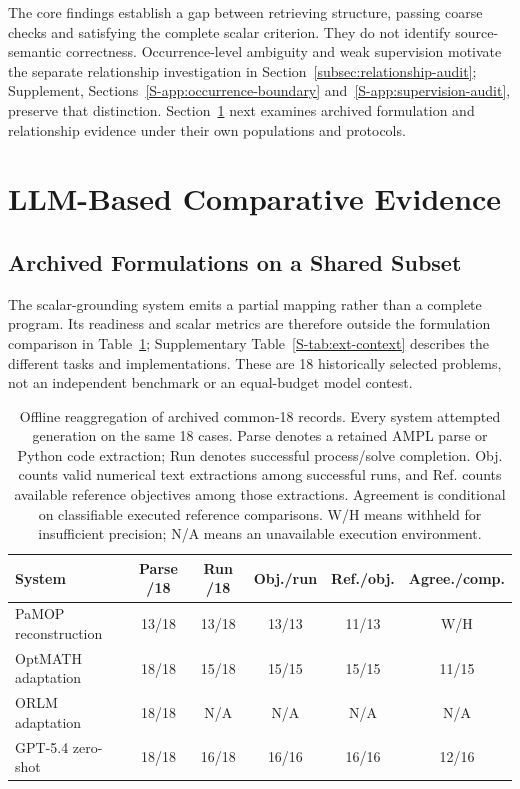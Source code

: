 \documentclass[pdflatex,sn-basic,Numbered]{sn-jnl}
\begin{document}
\label{subsec:numerical-grounding-challenges}
The core findings establish a gap between retrieving structure, passing coarse checks and satisfying the complete scalar criterion. They do not identify source-semantic correctness. Occurrence-level ambiguity and weak supervision motivate the separate relationship investigation in Section~\ref{subsec:relationship-audit}; Supplement, Sections~\ref{S-app:occurrence-boundary} and~\ref{S-app:supervision-audit}, preserve that distinction. Section~\ref{sec:llm} next examines archived formulation and relationship evidence under their own populations and protocols.

\section{LLM-Based Comparative Evidence}
\label{sec:llm}
\subsection{Archived Formulations on a Shared Subset}
\label{subsec:exp_external}
The scalar-grounding system emits a partial mapping rather than a complete program. Its readiness and scalar metrics are therefore outside the formulation comparison in Table~\ref{tab:ext-outcomes}; Supplementary Table~\ref{S-tab:ext-context} describes the different tasks and implementations. These are 18 historically selected problems, not an independent benchmark or an equal-budget model contest.

\begin{table}[t]
\centering\small
\caption{Offline reaggregation of archived common-18 records. Every system attempted generation on the same 18 cases. Parse denotes a retained AMPL parse or Python code extraction; Run denotes successful process/solve completion. Obj. counts valid numerical text extractions among successful runs, and Ref. counts available reference objectives among those extractions. Agreement is conditional on classifiable executed reference comparisons. W/H means withheld for insufficient precision; N/A means an unavailable execution environment.}
\label{tab:ext-outcomes}
\setlength{\tabcolsep}{2.5pt}
\begin{tabular}{@{}lccccc@{}}
\toprule
System & Parse /18 & Run /18 & Obj./run & Ref./obj. & Agree./comp.\\
\midrule
PaMOP reconstruction & 13/18 & 13/18 & 13/13 & 11/13 & W/H\\
OptMATH adaptation & 18/18 & 15/18 & 15/15 & 15/15 & 11/15\\
ORLM adaptation & 18/18 & N/A & N/A & N/A & N/A\\
GPT-5.4 zero-shot & 18/18 & 16/18 & 16/16 & 16/16 & 12/16\\
\bottomrule
\end{tabular}
\end{table}
\end{document}
